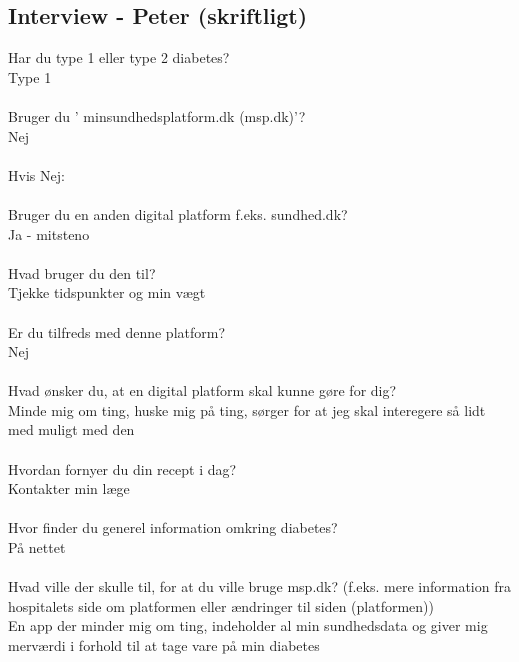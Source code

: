 \subsection*{Interview - Peter (skriftligt)}
Har du type 1 eller type 2 diabetes?\\
Type 1
\\ \\
Bruger  du ’ minsundhedsplatform.dk (msp.dk)’?\\
Nej
\\ \\
Hvis Nej:
\\ \\
Bruger du en anden digital platform f.eks. sundhed.dk?\\
Ja - mitsteno
\\ \\
Hvad bruger du den til?\\
Tjekke tidspunkter og min vægt
\\ \\
Er du tilfreds med denne platform?\\
Nej
\\ \\
Hvad ønsker du, at en digital platform skal kunne gøre for dig?\\
Minde mig om ting, huske mig på ting, sørger for at jeg skal interegere så lidt med muligt med den
\\ \\
Hvordan fornyer du din recept i dag?\\
Kontakter min læge
\\ \\
Hvor finder du generel information omkring diabetes?\\
På nettet
\\ \\
Hvad ville der skulle til, for at du ville bruge msp.dk? (f.eks. mere information fra hospitalets side om platformen eller ændringer til siden (platformen))\\
En app der minder mig om ting, indeholder al min sundhedsdata og giver mig merværdi i forhold til at tage vare på min diabetes